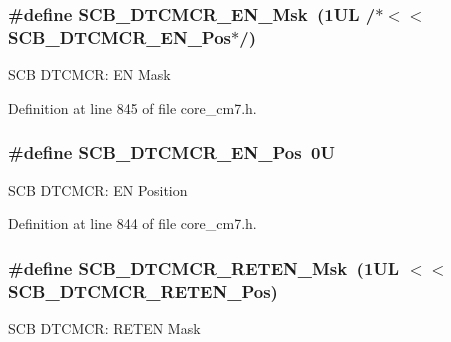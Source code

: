 \subsubsection[{\texorpdfstring{S\+C\+B\+\_\+\+D\+T\+C\+M\+C\+R\+\_\+\+E\+N\+\_\+\+Msk}{SCB_DTCMCR_EN_Msk}}]{\setlength{\rightskip}{0pt plus 5cm}\#define S\+C\+B\+\_\+\+D\+T\+C\+M\+C\+R\+\_\+\+E\+N\+\_\+\+Msk~(1\+U\+L /$\ast$$<$$<$ S\+C\+B\+\_\+\+D\+T\+C\+M\+C\+R\+\_\+\+E\+N\+\_\+\+Pos$\ast$/)}\hypertarget{group___c_m_s_i_s___s_c_b_gafd9689d338f30fa434c7629083f29608}{}\label{group___c_m_s_i_s___s_c_b_gafd9689d338f30fa434c7629083f29608}
S\+CB D\+T\+C\+M\+CR\+: EN Mask 

Definition at line 845 of file core\+\_\+cm7.\+h.

\subsubsection[{\texorpdfstring{S\+C\+B\+\_\+\+D\+T\+C\+M\+C\+R\+\_\+\+E\+N\+\_\+\+Pos}{SCB_DTCMCR_EN_Pos}}]{\setlength{\rightskip}{0pt plus 5cm}\#define S\+C\+B\+\_\+\+D\+T\+C\+M\+C\+R\+\_\+\+E\+N\+\_\+\+Pos~0U}\hypertarget{group___c_m_s_i_s___s_c_b_gaf3ba6873b9288121146a6432db53540f}{}\label{group___c_m_s_i_s___s_c_b_gaf3ba6873b9288121146a6432db53540f}
S\+CB D\+T\+C\+M\+CR\+: EN Position 

Definition at line 844 of file core\+\_\+cm7.\+h.

\subsubsection[{\texorpdfstring{S\+C\+B\+\_\+\+D\+T\+C\+M\+C\+R\+\_\+\+R\+E\+T\+E\+N\+\_\+\+Msk}{SCB_DTCMCR_RETEN_Msk}}]{\setlength{\rightskip}{0pt plus 5cm}\#define S\+C\+B\+\_\+\+D\+T\+C\+M\+C\+R\+\_\+\+R\+E\+T\+E\+N\+\_\+\+Msk~(1\+U\+L $<$$<$ S\+C\+B\+\_\+\+D\+T\+C\+M\+C\+R\+\_\+\+R\+E\+T\+E\+N\+\_\+\+Pos)}\hypertarget{group___c_m_s_i_s___s_c_b_gaa69bbf5b17808383d88f23a424c1b62e}{}\label{group___c_m_s_i_s___s_c_b_gaa69bbf5b17808383d88f23a424c1b62e}
S\+CB D\+T\+C\+M\+CR\+: R\+E\+T\+EN Mask 

